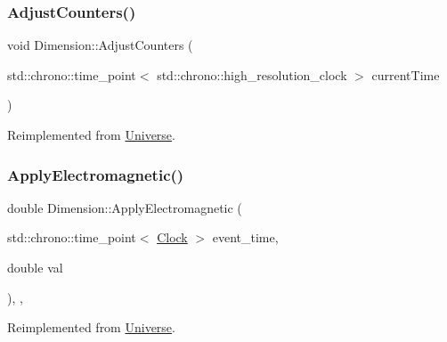 \subsubsection{\texorpdfstring{Adjust\+Counters()}{AdjustCounters()}}
{\footnotesize\ttfamily void Dimension\+::\+Adjust\+Counters (\begin{DoxyParamCaption}\item[{std\+::chrono\+::time\+\_\+point$<$ std\+::chrono\+::high\+\_\+resolution\+\_\+clock $>$}]{current\+Time }\end{DoxyParamCaption})\hspace{0.3cm}{\ttfamily [virtual]}}



Reimplemented from \mbox{\hyperlink{classUniverse_a15aa20218286fd11ecb9b792dfb63be3}{Universe}}.

\mbox{\label{classDimension_a65bcd3c09792cf53b1f614eff49cf111}} 
\subsubsection{\texorpdfstring{Apply\+Electromagnetic()}{ApplyElectromagnetic()}}
{\footnotesize\ttfamily double Dimension\+::\+Apply\+Electromagnetic (\begin{DoxyParamCaption}\item[{std\+::chrono\+::time\+\_\+point$<$ \mbox{\hyperlink{universe_8h_a0ef8d951d1ca5ab3cfaf7ab4c7a6fd80}{Clock}} $>$}]{event\+\_\+time,  }\item[{double}]{val }\end{DoxyParamCaption})\hspace{0.3cm}{\ttfamily [inline]}, {\ttfamily [final]}, {\ttfamily [virtual]}}



Reimplemented from \mbox{\hyperlink{classUniverse_a1f787da78fa196ba635db21a9e91dabb}{Universe}}.

\mbox{\label{classDimension_ab13e8ed50a4373274636e542c917db01}} 
